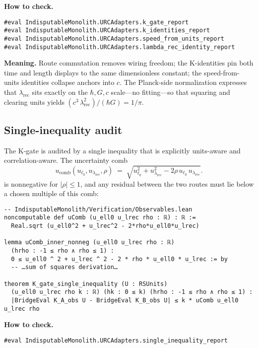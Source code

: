 \documentclass[11pt,a4paper,twoside]{article}
\numberwithin{equation}{section}
\theoremstyle{customthm}
\theoremstyle{customdef}
\theoremstyle{customrem}
\begin{document}
\noindent \textbf{How to check.}
\begin{lstlisting}
#eval IndisputableMonolith.URCAdapters.k_gate_report
#eval IndisputableMonolith.URCAdapters.k_identities_report
#eval IndisputableMonolith.URCAdapters.speed_from_units_report
#eval IndisputableMonolith.URCAdapters.lambda_rec_identity_report
\end{lstlisting}

\noindent \textbf{Meaning.} Route commutation removes wiring freedom; the K-identities pin both time and length displays to the same dimensionless constant; the speed-from-units identities collapse anchors into \(c\). The Planck-side normalization expresses that \(\lambda_{\mathrm{rec}}\) sits exactly on the \(\hbar,G,c\) scale—no fitting—so that squaring and clearing units yields \((c^3\,\lambda_{\mathrm{rec}}^2)/(\hbar G)=1/\pi\).

\subsection{Single-inequality audit}\label{subsec:audit-single}

The K-gate is audited by a single inequality that is explicitly units-aware and correlation-aware. The uncertainty comb
\[
u_{\mathrm{comb}}(u_{\ell_0},u_{\lambda_{\mathrm{rec}}},\rho)
\;=\; \sqrt{u_{\ell_0}^2 + u_{\lambda_{\mathrm{rec}}}^2 - 2\rho\,u_{\ell_0}\,u_{\lambda_{\mathrm{rec}}}}.
\]
is nonnegative for \(|\rho|\le 1\), and any residual between the two routes must lie below a chosen multiple of this comb:
\begin{lstlisting}
-- IndisputableMonolith/Verification/Observables.lean
noncomputable def uComb (u_ell0 u_lrec rho : ℝ) : ℝ :=
  Real.sqrt (u_ell0^2 + u_lrec^2 - 2*rho*u_ell0*u_lrec)

lemma uComb_inner_nonneg (u_ell0 u_lrec rho : ℝ)
  (hrho : -1 ≤ rho ∧ rho ≤ 1) :
  0 ≤ u_ell0 ^ 2 + u_lrec ^ 2 - 2 * rho * u_ell0 * u_lrec := by
  -- …sum of squares derivation…

theorem K_gate_single_inequality (U : RSUnits)
  (u_ell0 u_lrec rho k : ℝ) (hk : 0 ≤ k) (hrho : -1 ≤ rho ∧ rho ≤ 1) :
  |BridgeEval K_A_obs U - BridgeEval K_B_obs U| ≤ k * uComb u_ell0 u_lrec rho
\end{lstlisting}

\noindent \textbf{How to check.}
\begin{lstlisting}
#eval IndisputableMonolith.URCAdapters.single_inequality_report
\end{lstlisting}
\end{document}
